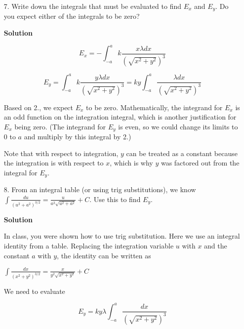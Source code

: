 \documentclass{article}
\begin{document}
\begin{enumerate}

  \item[7.] Write down the integrals that must be evaluated to find $E_x$ and $E_y$. Do you expect either of the integrals to be zero?

            \ifsolutions
            \textbf{Solution}

            \begin{equation}
            E_x = -\int_{-a}^{a} k\frac{x\lambda dx}{(\sqrt{x^2+y^2})^3}
            \end{equation}

            \begin{equation}
            E_y = \int_{-a}^{a} k\frac{y\lambda dx}{(\sqrt{x^2+y^2})^3}=ky\int_{-a}^{a} \frac{\lambda dx}{(\sqrt{x^2+y^2})^3}
            \end{equation}

            Based on 2., we expect $E_x$ to be zero. Mathematically, the integrand for $E_x$ is an odd function on the integration integral, which is another justification for $E_x$ being zero. (The integrand for $E_y$ is even, so we could change its limits to $0$ to $a$ and multiply by this integral by 2.)

            Note that with respect to integration, $y$ can be treated as a constant because the integration is with respect to $x$, which is why $y$ was factored out from the integral for $E_y$.
            \else

            \vskip 96pt
            \fi
            \ifsolutions\else
            \vskip 96pt
            \fi

  \item[8.] From an integral table (or using trig substitutions), we know $\displaystyle \int \frac{du}{(u^2+a^2)^{3/2}} = \frac{u}{a^2\sqrt{u^2+a^2}} + C$. Use this to find $E_y$.

            \ifsolutions
            \textbf{Solution}

            In class, you were shown how to use trig substitution. Here we use an integral identity from a table. Replacing the integration variable $u$ with $x$ and the constant $a$ with $y$, the identity can be written as

            $\displaystyle \int \frac{dx}{(x^2+y^2)^{3/2}} = \frac{x}{y^2\sqrt{x^2+y^2}} + C$

            We need to evaluate

            \begin{equation}
            E_y = ky\lambda \int_{-a}^{a} \frac{dx}{(\sqrt{x^2+y^2})^3}
            \end{equation}


\end{enumerate}
\end{document}
